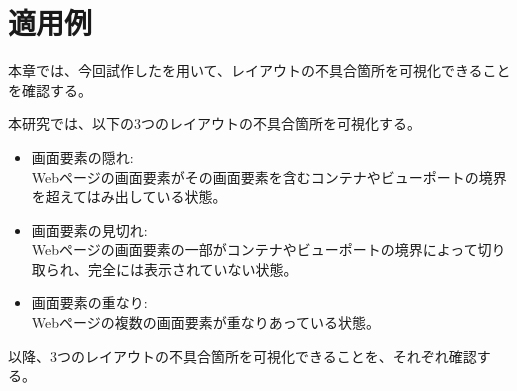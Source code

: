 \chapter{適用例}\label{cha:Indication}
本章では、今回試作した\toolName を用いて、レイアウトの不具合箇所を可視化できることを確認する。
\par
本研究では、以下の3つのレイアウトの不具合箇所を可視化する。
\begin{itemize}
    \setlength{\itemsep}{0pt}
          \setlength{\parsep}{0pt}
    \item 画面要素の隠れ:\\
          Webページの画面要素がその画面要素を含むコンテナやビューポートの境界を超えてはみ出している状態。
    \item 画面要素の見切れ:\\
          Webページの画面要素の一部がコンテナやビューポートの境界によって切り取られ、完全には表示されていない状態。
    \item 画面要素の重なり:\\
          Webページの複数の画面要素が重なりあっている状態。
\end{itemize}
\par
以降、3つのレイアウトの不具合箇所を可視化できることを、それぞれ確認する。
